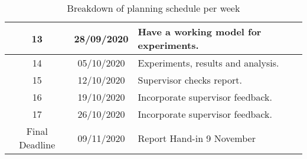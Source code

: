 \begin{table}[H]
\begin{center}
\begin{tabular}{|c|c|p{8cm}|}
      13 & 28/09/2020 & Have a working model for experiments.\\ \hline
      
      14 & 05/10/2020 & Experiments, results and analysis.\\ \hline
      
      
      15 & 12/10/2020 & Supervisor checks report.\\ \hline
      
      16 & 19/10/2020 & Incorporate supervisor feedback.\\ \hline
      
      17 & 26/10/2020 & Incorporate supervisor feedback.\\ \hline
      
      Final Deadline & 09/11/2020 &  Report Hand-in 9 November\\ 
      
      \hline
    \end{tabular}
  \end{center}
  \caption{Breakdown of planning schedule per week}
    \label{tab:tablea1}
\end{table}